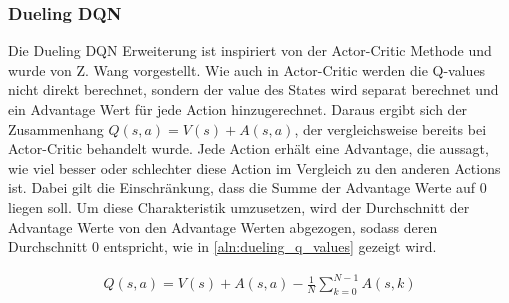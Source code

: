 \documentclass[11pt]{scrartcl}
\begin{document}
\subsubsection{Dueling DQN}
Die Dueling DQN Erweiterung ist inspiriert von der Actor-Critic Methode und wurde von
Z. Wang \cite{wang2015dueling} vorgestellt. Wie auch in Actor-Critic werden die Q-values
nicht direkt berechnet, sondern der value des States wird separat berechnet und ein
Advantage Wert für jede Action hinzugerechnet. Daraus ergibt sich der Zusammenhang
$Q(s, a) = V(s) + A(s, a)$, der vergleichsweise bereits bei Actor-Critic behandelt wurde.
Jede Action erhält eine Advantage, die aussagt, wie viel besser oder schlechter diese
Action im Vergleich zu den anderen Actions ist. Dabei gilt die Einschränkung, dass die
Summe der Advantage Werte auf 0 liegen soll. Um diese Charakteristik umzusetzen, wird
der Durchschnitt der Advantage Werte von den Advantage Werten abgezogen, sodass deren
Durchschnitt 0 entspricht, wie in \autoref{aln:dueling_q_values} gezeigt wird.

\begin{align}
  Q(s, a) = V(s) + A(s, a) - \frac{1}{N} \sum_{k=0}^{N-1} A(s, k)
  \label{aln:dueling_q_values}
\end{align}
\end{document}
